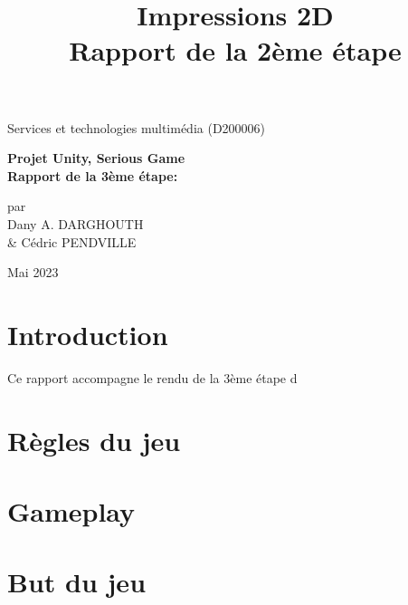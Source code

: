 \documentclass{article}
\title{Impressions 2D\\Rapport de la 2ème étape}
\author{}
\date{}
\begin{document}
\begin{titlepage}
	\begin{center}

		\vspace*{2cm}
		
		{\Large Services et technologies multimédia (D200006)} %
		
		\vspace{5cm}
		{\huge\textbf{Projet Unity, Serious Game\\Rapport de la 3ème étape:\\ }}
		
		\vspace{4cm}
		{par\\\large Dany A. DARGHOUTH \\\& Cédric PENDVILLE}
		\vfill
		
		Mai 2023
		
		
		\end{center}
\end{titlepage}

\maketitle
\tableofcontents
\newpage

\section{Introduction}
Ce rapport accompagne le rendu de la 3ème étape d
\section{Règles du jeu}
\section{Gameplay}
\section{But du jeu}
\end{document}
